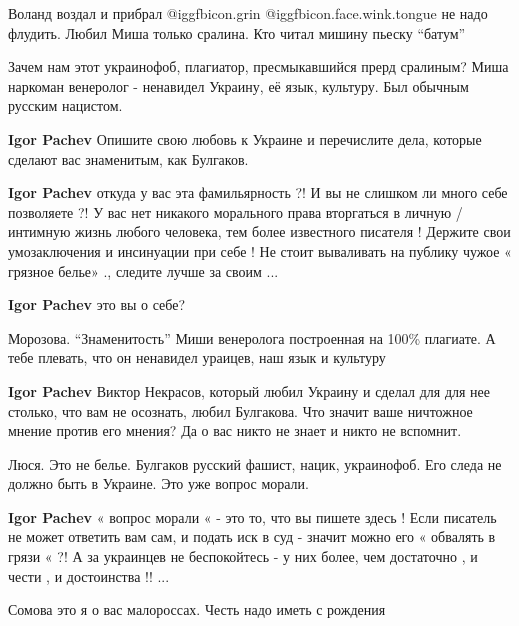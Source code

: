 \begin{itemize}

Воланд воздал и прибрал  @igg{fbicon.grin}  @igg{fbicon.face.wink.tongue}  не
надо флудить. Любил Миша только сралина. Кто читал мишину пьеску
\enquote{батум}


Зачем нам этот украинофоб, плагиатор, пресмыкавшийся прерд сралиным? Миша
наркоман венеролог - ненавидел Украину, её язык, культуру. Был обычным русским
нацистом.

\begin{itemize} %
\textbf{Igor Pachev} Опишите свою любовь к Украине и перечислите дела, которые сделают вас знаменитым, как Булгаков.

\textbf{Igor Pachev} откуда у вас эта фамильярность ?! И вы не слишком ли много себе позволяете ?! У вас нет никакого морального права вторгаться в личную / интимную жизнь любого человека, тем более известного писателя ! Держите свои умозаключения и инсинуации при себе ! Не стоит вываливать на публику чужое « грязное белье» ., следите лучше за своим ...

\textbf{Igor Pachev} это вы о себе?

Морозова. \enquote{Знаменитость} Миши венеролога построенная на 100\% плагиате.
А тебе плевать, что он ненавидел ураицев, наш язык и культуру

\begin{itemize} %
\textbf{Igor Pachev} Виктор Некрасов, который любил Украину и сделал для для нее столько, что вам не осознать, любил Булгакова. Что значит ваше ничтожное мнение против его мнения? Да о вас никто не знает и никто не вспомнит.
\end{itemize} %


Люся. Это не белье. Булгаков русский фашист, нацик, украинофоб. Его следа не
должно быть в Украине. Это уже вопрос морали.

\begin{itemize} %
\textbf{Igor Pachev} « вопрос морали « - это то, что вы пишете здесь ! Если писатель не может ответить вам сам, и подать иск в суд - значит можно его « обвалять в грязи « ?! А за украинцев не беспокойтесь - у них более, чем достаточно , и чести , и достоинства !! ...
\end{itemize} %

Сомова это я о вас малороссах. Честь надо иметь с рождения


\end{itemize}
\end{itemize}
